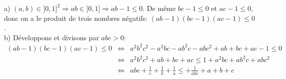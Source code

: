 a) $(a,b)\in ]0,1]^2 \Rightarrow ab \in ]0,1] \Rightarrow ab-1\leq 0$. De même $bc-1\leq 0$ et $ac-1\leq 0$, donc on a le produit de trois nombres négatifs: $(ab-1)(bc-1)(ac-1)\leq 0$. \\
b) Développons et divisons par $abc > 0$:
\begin{eqnarray}
  (ab-1)(bc-1)(ac-1)\leq 0 & \Leftrightarrow & a^2b^2c^2-a^2bc-ab^2c-abc^2 + ab + bc+ac-1 \leq 0 \nonumber \\
   & \Leftrightarrow & a^2b^2c^2+ ab + bc+ac \leq 1 + a^2bc+ ab^2c + abc^2 \nonumber \\
   & \Leftrightarrow & abc + \frac{1}{c} + \frac{1}{b} + \frac{1}{a}  \leq + \frac{1}{abc} + a+b+c \nonumber
\end{eqnarray}
